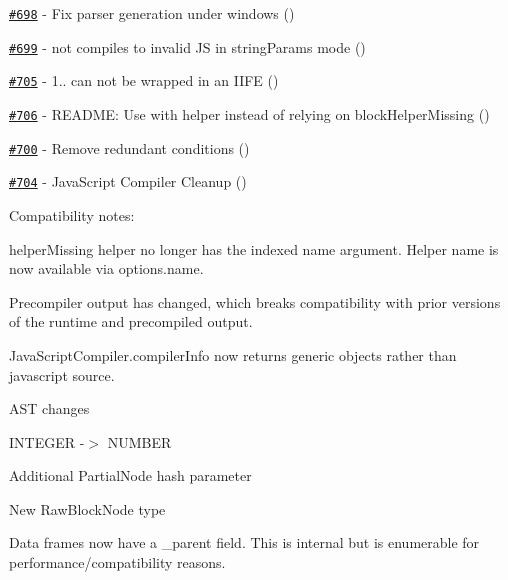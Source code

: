 \begin{DoxyItemize}
\item \href{https://github.com/wycats/handlebars.js/pull/698}{\tt \#698} -\/ Fix parser generation under windows (\href{https://api.github.com/users/osiris43}{\tt })
\item \href{https://github.com/wycats/handlebars.js/issues/699}{\tt \#699} -\/  not compiles to invalid J\+S in string\+Params mode (\href{https://api.github.com/users/kpdecker}{\tt })
\item \href{https://github.com/wycats/handlebars.js/issues/705}{\tt \#705} -\/ 1.. can not be wrapped in an I\+I\+F\+E (\href{https://api.github.com/users/craigteegarden}{\tt })
\item \href{https://github.com/wycats/handlebars.js/pull/706}{\tt \#706} -\/ R\+E\+A\+D\+M\+E\+: Use with helper instead of relying on block\+Helper\+Missing (\href{https://api.github.com/users/scottgonzalez}{\tt })
\item \href{https://github.com/wycats/handlebars.js/pull/700}{\tt \#700} -\/ Remove redundant conditions (\href{https://api.github.com/users/blakeembrey}{\tt })
\item \href{https://github.com/wycats/handlebars.js/pull/704}{\tt \#704} -\/ Java\+Script Compiler Cleanup (\href{https://api.github.com/users/blakeembrey}{\tt })
\end{DoxyItemize}

Compatibility notes\+:
\begin{DoxyItemize}
\item {\ttfamily helper\+Missing} helper no longer has the indexed name argument. Helper name is now available via {\ttfamily options.\+name}.
\item Precompiler output has changed, which breaks compatibility with prior versions of the runtime and precompiled output.
\item {\ttfamily Java\+Script\+Compiler.\+compiler\+Info} now returns generic objects rather than javascript source.
\item A\+S\+T changes
\begin{DoxyItemize}
\item I\+N\+T\+E\+G\+E\+R -\/$>$ N\+U\+M\+B\+E\+R
\item Additional Partial\+Node hash parameter
\item New Raw\+Block\+Node type
\end{DoxyItemize}
\item Data frames now have a {\ttfamily \+\_\+parent} field. This is internal but is enumerable for performance/compatibility reasons.
\end{DoxyItemize}

